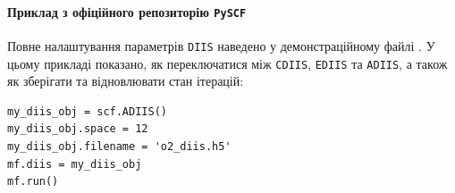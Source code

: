 \paragraph{Приклад з офіційного репозиторію \texttt{PySCF}}
Повне налаштування параметрів \texttt{DIIS} наведено у демонстраційному файлі
.
У цьому прикладі показано, як переключатися між \texttt{CDIIS}, \texttt{EDIIS} та \texttt{ADIIS},
а також як зберігати та відновлювати стан ітерацій:
\begin{verbatim}
my_diis_obj = scf.ADIIS()
my_diis_obj.space = 12
my_diis_obj.filename = 'o2_diis.h5'
mf.diis = my_diis_obj
mf.run()
\end{verbatim}


%
%
%
%
%
%
%
%
